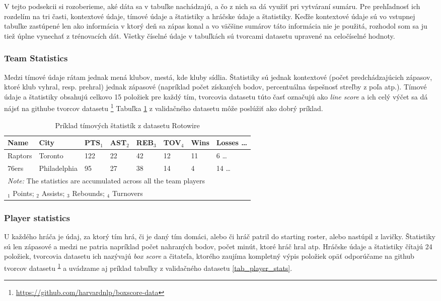 V tejto podsekcii si rozoberieme, aké dáta sa v tabuľke nachádzajú, a čo z nich sa dá využiť pri vytváraní sumáru. Pre prehľadnosť ich rozdelím na tri časti, kontextové údaje, tímové údaje a štatistiky a hráčske údaje a štatistiky. Keďže kontextové údaje sú vo vstupnej tabuľke zastúpené len ako informácia v ktorý deň sa zápas konal a vo väčšine sumárov táto informácia nie je použitá, rozhodol som sa ju tiež úplne vynechať z trénovacích dát. Všetky číselné údaje v tabuľkách sú tvorcami datasetu upravené na celočíselné hodnoty.

\subsubsection{Team Statistics}

Medzi tímové údaje rátam jednak mená klubov, mestá, kde kluby sídlia. \linebreak[4] Štatistiky sú jednak kontextové (počet predchádzajúcich zápasov, ktoré klub vyhral, resp. prehral) jednak zápasové (napríklad počet získaných bodov, percentuálna úspešnosť streľby z poľa atp.). Tímové údaje a štatistiky obsahujú celkovo 15 položiek pre každý tím, tvorcovia datasetu túto časť označujú ako \emph{line score} a ich celý výčet sa dá nájsť na githube tvorcov datasetu \footnote{\label{note1}\url{https://github.com/harvardnlp/boxscore-data}} Tabuľka \ref{tab_team_stats} z validačného datasetu môže poslúžiť ako dobrý príklad.

\begin{table}[bh!]
    \begin{tabular}{llllllll}
        \toprule
        Name    & City         & PTS$_1$ & AST$_2$ & REB$_3$ & TOV$_4$ & Wins & Losses  \dots \\
        \midrule
        Raptors & Toronto      & 122 & 22  & 42  & 12  & 11   & 6       \dots \\
        76ers   & Philadelphia & 95  & 27  & 38  & 14  & 4    & 14      \dots \\
        \bottomrule
        \multicolumn{8}{l}{\footnotesize \textit{Note:} The statistics are accumulated across all the team players} \\
        \multicolumn{8}{l}{\footnotesize $_1$ Points; $_2$ Assists; $_3$ Rebounds; $_4$ Turnovers}
    \end{tabular}
    \caption{Príklad tímových štatistík z datasetu Rotowire}\label{tab_team_stats}
\end{table}

\subsubsection{Player statistics}
U každého hráča je údaj, za ktorý tím hrá, či je daný tím domáci, alebo či hráč patril do starting roster, alebo nastúpil z lavičky. Štatistiky sú len zápasové a medzi ne patria napríklad počet nahraných bodov, počet minút, ktoré hráč hral atp. Hráčske údaje a štatistiky čítajú 24 položiek, tvorcovia datasetu ich nazývajú \emph{box score} a čitateľa, ktorého zaujíma kompletný výpis položiek opäť odporúčame na github tvorcov datasetu \textsuperscript{\ref{note1}} a uvádzame aj príklad tabuľky z validačného datasetu \ref{tab_player_stats}.

